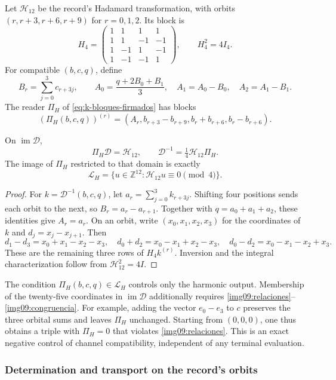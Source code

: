 Let $\mathcal H_{12}$ be the record's Hadamard transformation,
with orbits $(r,r+3,r+6,r+9)$ for $r=0,1,2$. Its block is
\[
 H_4=\begin{pmatrix}
 1&1&1&1\\1&1&-1&-1\\1&-1&1&-1\\1&-1&-1&1
 \end{pmatrix},\qquad H_4^2=4I_4.
\]
For compatible $(b,c,q)$, define
\[
 B_r=\sum_{j=0}^3c_{r+3j},\qquad
 A_0=\frac{q+2B_0+B_1}{3},\quad A_1=A_0-B_0,
 \quad A_2=A_1-B_1.
\]
The reader $\Pi_H$ of \eqref{eq:k-bloques-firmados} has blocks
\[
 (\Pi_H(b,c,q))^{(r)}=
 (A_r,b_{r+3}-b_{r+9},b_r+b_{r+6},b_r-b_{r+6}).
\]

\begin{proposition}
\label{img09:triangulo}
On $\operatorname{im}\mathcal D$,
\[
 \Pi_H\mathcal D=\mathcal H_{12},\qquad
 \mathcal D^{-1}=\tfrac14\mathcal H_{12}\Pi_H.
\]
The image of $\Pi_H$ restricted to that domain is exactly
\[
 \mathcal L_H=
 \{u\in\mathbb Z^{12}:\mathcal H_{12}u\equiv0\pmod4\}.
\]
\end{proposition}
\begin{proof}
For $k=\mathcal D^{-1}(b,c,q)$, let
$a_r=\sum_{j=0}^3k_{r+3j}$. Shifting four positions
sends each orbit to the next, so $B_r=a_r-a_{r+1}$.
Together with $q=a_0+a_1+a_2$, these identities give $A_r=a_r$.
On an orbit, write $(x_0,x_1,x_2,x_3)$ for the coordinates
of $k$ and $d_j=x_j-x_{j+1}$. Then
\[
 d_1-d_3=x_0+x_1-x_2-x_3,\quad
 d_0+d_2=x_0-x_1+x_2-x_3,\quad
 d_0-d_2=x_0-x_1-x_2+x_3.
\]
These are the remaining three rows of $H_4k^{(r)}$. Inversion and the
integral characterization follow from $\mathcal H_{12}^2=4I$.
\end{proof}

The condition $\Pi_H(b,c,q)\in\mathcal L_H$ controls only the
harmonic output. Membership of the twenty-five coordinates in
$\operatorname{im}\mathcal D$ additionally requires
\eqref{img09:relaciones}--\eqref{img09:congruencia}.
For example, adding the vector $e_0-e_3$ to $c$ preserves the three
orbital sums and leaves $\Pi_H$ unchanged. Starting from $(0,0,0)$,
one thus obtains a triple with $\Pi_H=0$ that violates
\eqref{img09:relaciones}. This is an exact negative control of
channel compatibility, independent of any terminal evaluation.

\subsubsection{Determination and transport on the record's orbits}

